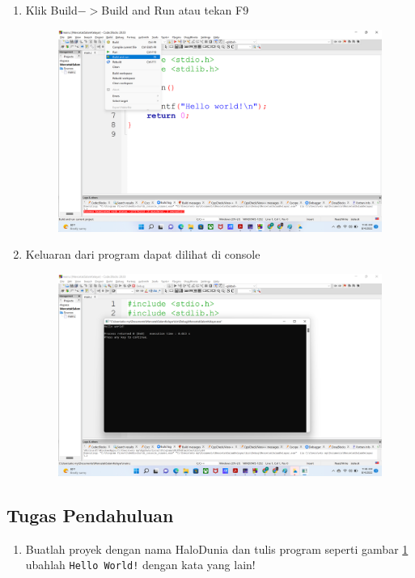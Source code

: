 \begin{enumerate}
\begin{figure}[H]
		      \caption{}
		      \label{fig:screenshot008}
	      \end{figure}
	\item Klik Build$->$Build and Run atau tekan F9
	      \begin{figure}[H]
		      \centering
		      \includegraphics[width=0.7\linewidth]{P1/img/screenshot009.png}
		      \caption{}
		      \label{fig:screenshot009}
	      \end{figure}
	\item Keluaran dari program dapat dilihat di console
	      \begin{figure}[H]
		      \centering
		      \includegraphics[width=0.7\linewidth]{P1/img/screenshot010.png}
		      \caption{}
		      \label{fig:screenshot010}
	      \end{figure}
\end{enumerate}

\subsection{Tugas Pendahuluan}
\begin{enumerate}
	\item Buatlah proyek dengan nama HaloDunia dan tulis program seperti gambar \ref{fig:screenshot008} ubahlah \verb|Hello World!| dengan kata yang lain!
\end{enumerate}

